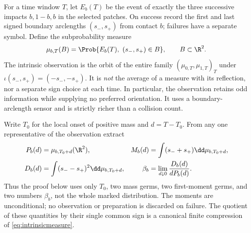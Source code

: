 For a time window $T$, let $E_b(T)$ be the event of exactly the three
successive impacts $b,1-b,b$ in the selected patches. On success record
the first and last signed boundary arclengths $(s_-,s_+)$ from contact
$b$; failures have a separate symbol. Define the subprobability measure
\begin{equation}\label{eq:intrinsicmeasure}
 \mu_{b,T}(B)=\Prob\{E_b(T),\ (s_-,s_+)\in B\},\qquad B\subset\R^2.
\end{equation}
The intrinsic observation is the orbit of the entire family
$(\mu_{0,T},\mu_{1,T})_T$ under
$\iota(s_-,s_+)=(-s_-,-s_+)$. It is \emph{not} the average of a
measure with its reflection, nor a separate sign choice at each time.
In particular, the observation retains odd information while supplying
no preferred orientation. It uses a boundary-arclength sensor and is
strictly richer than a collision count.

Write $T_0$ for the local onset of positive mass and $d=T-T_0$.
From any one representative of the observation extract
\begin{align}
 P_b(d)&=\mu_{b,T_0+d}(\R^2),&
 M_b(d)&=\int(s_-+s_+)\dd\mu_{b,T_0+d},\label{eq:arcdatum}\\
 D_b(d)&=\int(s_--s_+)^2\dd\mu_{b,T_0+d},&
 \beta_b&=\lim_{d\downarrow0}\frac{D_b(d)}{dP_b(d)}.\label{eq:betadef}
\end{align}
Thus the proof below uses only $T_0$, two mass germs, two first-moment
germs, and two numbers $\beta_b$, not the whole marked distribution.
The moments are unconditional; no observation or preparation is discarded
on failure. The quotient of these quantities by their single common sign
is a canonical finite compression of \eqref{eq:intrinsicmeasure}.

